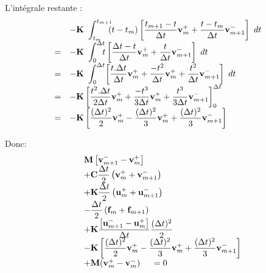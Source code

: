 \documentclass[12pt,a4paper]{report}
\begin{document}
L'intégrale restante :
\begin{equation}
\begin{array}{r l}
	  &\displaystyle	    
	    -\mathbf{K}~\int_{t_m}^{t_{m+1}} \!\!\! 	
		(t-t_m) \left[
			\frac{t_{m+1}-t}{\Delta t} \mathbf{v}_m^+ + 
			\frac{t-t_m}{\Delta t} \mathbf{v}_{m+1}^- 
			\right] ~dt
	\\
	=&\displaystyle	    
	    -\mathbf{K}~\int_{0}^{\Delta t} \!\!\! 	
		t \left[
			\frac{\Delta t-t}{\Delta t} \mathbf{v}_m^+ + 
			\frac{t}{\Delta t} \mathbf{v}_{m+1}^- 
			\right] ~dt
	\\
	=&\displaystyle	    
	    -\mathbf{K}~\int_{0}^{\Delta t} \!	
		\left[
			\frac{t.\Delta t}{\Delta t} \mathbf{v}_m^+  
			+\frac{-t^2}{\Delta t} \mathbf{v}_m^+  
			+\frac{t^2}{\Delta t} \mathbf{v}_{m+1}^- 
		\right] ~dt
	\\
	=&\displaystyle	    
	    -\mathbf{K}
		\left[
			\frac{t^2.\Delta t}{2 \Delta t} \mathbf{v}_m^+  
			+\frac{-t^3}{3 \Delta t} \mathbf{v}_m^+  
			+\frac{t^3}{3 \Delta t} \mathbf{v}_{m+1}^- 
		\right]_{0}^{\Delta t} 
	\\
	=&\displaystyle	    
	    -\mathbf{K}
		\left[
			\frac{(\Delta t)^2}{2} \mathbf{v}_m^+  
			-\frac{(\Delta t)^2}{3} \mathbf{v}_m^+  
			+\frac{(\Delta t)^2}{3} \mathbf{v}_{m+1}^- 
		\right]
\end{array}
\end{equation}

Donc:
\begin{equation}
\begin{array}{r l}
	&\displaystyle
	 \mathbf{M}
	    	\left[ \mathbf{v}_{m+1}^- 
	    		- \mathbf{v}_m^+ \right]
	\\ 
	  &\displaystyle
	  +\mathbf{C} \frac{\Delta t}{2}
		\left(
			\mathbf{v}_m^+ + 
			\mathbf{v}_{m+1}^- 
		\right) 
	\\
	  &\displaystyle
	 +\mathbf{K} \frac{\Delta t}{2}
		\left(
			\mathbf{u}_m^+ + 
			\mathbf{u}_{m+1}^- 
		\right)
	\\
	  &\displaystyle
	   -\frac{\Delta t}{2}
		\left(
			\mathbf{f}_m + 
			\mathbf{f}_{m+1}
		\right)
	\\
	  &+\displaystyle
	    \mathbf{K}
	    	\frac{\left[ \mathbf{u}_{m+1}^- 
	    		- \mathbf{u}_m^+ \right]    }{\Delta t}		
			\frac{(\Delta t)^2}{2}
	\\
	  &\displaystyle	    
	    -\mathbf{K}
		\left[
			\frac{(\Delta t)^2}{2} \mathbf{v}_m^+  
			-\frac{(\Delta t)^2}{3} \mathbf{v}_m^+  
			+\frac{(\Delta t)^2}{3} \mathbf{v}_{m+1}^- 
		\right]
	\\
	  &+  \mathbf{M}(\mathbf{v}_m^+ - \mathbf{v}_m^-)
	~~~~=0	
\end{array}
\end{equation}
\end{document}
